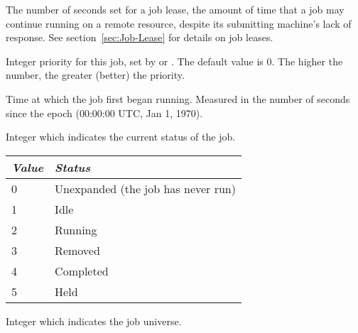 \begin{description}
\item[\AdAttr{JobLeaseDuration}:]  The number of seconds set for
a job lease, the amount of time that a job may continue running
on a remote resource,
despite its submitting machine's lack of response.
See section~\ref{sec:Job-Lease} for details on job leases.

\item[\AdAttr{JobPrio}:]  Integer priority for this job, set by
 or .  The default value is 0.  The higher
the number, the greater (better) the priority.

\item[\AdAttr{JobStartDate}:]  Time at which the job first began
running.  Measured in the
number of seconds since the epoch (00:00:00 UTC, Jan 1, 1970).

\item[\AdAttr{JobStatus}:]  Integer which indicates the current
status of the job.
\begin{center}
\begin{table}[hbt]
\begin{tabular}{|p{2cm}p{10cm}|} \hline
\emph{Value} & \emph{Status} \\ \hline \hline
0 & Unexpanded (the job has never run) \\ \hline
1 & Idle \\ \hline
2 & Running \\ \hline
3 & Removed \\ \hline
4 & Completed \\ \hline
5 & Held \\ \hline
\end{tabular}
\end{table}
\end{center}

\item[\AdAttr{JobUniverse}:]  Integer which indicates the job
universe.


\end{description}

